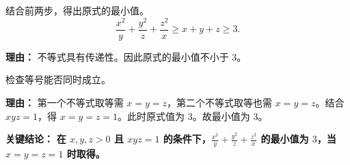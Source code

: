 \begin{examplebox}
\begin{description}[style=nextline, leftmargin=2.8em, labelsep=0.5em, itemsep=0.45em]
    \item[\textbf{第三步（得到最小值）：}] 结合前两步，得出原式的最小值。
    \[
        \frac{x^2}{y} + \frac{y^2}{z} + \frac{z^2}{x} \geq x + y + z \geq 3.
    \]
    \par\textbf{理由：} 不等式具有传递性。因此原式的最小值不小于 $3$。

    \item[\textbf{第四步（验证可达到）：}] 检查等号能否同时成立。
    \par\textbf{理由：} 第一个不等式取等需 $x=y=z$，第二个不等式取等也需 $x=y=z$。结合 $xyz=1$，得 $x=y=z=1$。此时原式值为 $3$。故最小值为 $3$。
\end{description}

\textbf{\textcolor{CExample}{关键结论：}} \textbf{在 $x,y,z>0$ 且 $xyz=1$ 的条件下，$\frac{x^2}{y} + \frac{y^2}{z} + \frac{z^2}{x}$ 的最小值为 $3$，当 $x=y=z=1$ 时取得。}
\end{examplebox}
